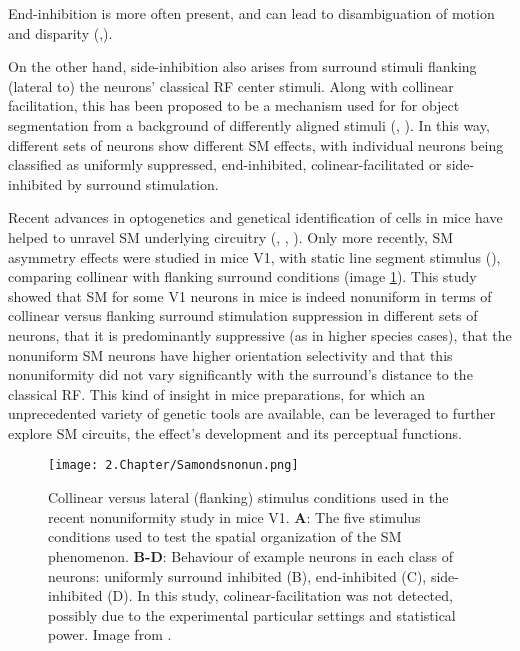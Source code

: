 End-inhibition is more often present, and can lead to disambiguation of motion and disparity (\cite{Heitger1992},\cite{Barth2000}). 

On the other hand, side-inhibition also arises from surround stimuli flanking (lateral to) the neurons' classical RF center stimuli. Along with collinear facilitation, this has been proposed to be a mechanism used for for object segmentation from a background of differently aligned stimuli (\cite{Field1993}, \cite{Kapadia1995}). In this way, different sets of neurons show different SM effects, with individual neurons being classified as uniformly suppressed, end-inhibited, colinear-facilitated or side-inhibited by surround stimulation.

Recent advances in optogenetics and genetical identification of cells in mice have helped to unravel SM underlying circuitry (\cite{Adesnik2012}, \cite{Nienborg2013}, \cite{Self2014}). 
Only more recently, SM asymmetry effects were studied in mice V1, with static line segment stimulus (\cite{Samonds2017}), comparing collinear with flanking surround conditions (image \ref{samondsnonun}). This study showed that SM  for some V1 neurons in mice is indeed nonuniform in terms of collinear versus flanking surround stimulation suppression in different sets of neurons, that it is predominantly suppressive (as in higher species cases), that the nonuniform SM neurons have higher orientation selectivity and that this nonuniformity did not vary significantly with the surround's distance to the classical RF. This kind of insight in mice preparations, for which an unprecedented variety of genetic tools are available, can be leveraged to further explore SM circuits, the effect's development and its perceptual functions.

\begin{figure}[H]
\center
\texttt{[image: 2.Chapter/Samondsnonun.png]}
\caption{Collinear versus lateral (flanking) stimulus conditions used in the recent nonuniformity study in mice V1.
\newline \textbf{A}: The five stimulus conditions used to test the spatial organization of the SM phenomenon.
\newline \textbf{B-D}: Behaviour of example neurons in each class of neurons: uniformly surround inhibited (B), end-inhibited (C), side-inhibited (D). In this study, colinear-facilitation was not detected, possibly due to the experimental particular settings and statistical power.
\newline \newline \tiny{Image from \cite{Samonds2017}.}}
\label{samondsnonun}
\end{figure}